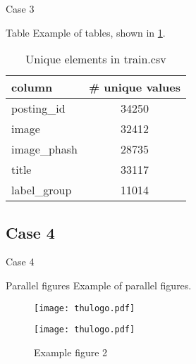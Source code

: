 \begin{frame}{Case 3}
  \begin{block}{Table}
    Example of tables, shown in \ref{tab:unique_values}. 

    \begin{table}[htbp]
      \small
      \centering
      \caption{Unique elements in train.csv }
      \label{tab:unique_values}
      \begin{tabular}{lc}
        \toprule
        column & \# unique values \\
        \midrule
        posting\_id & 34250 \\
        image & 32412 \\
        image\_phash & 28735 \\
        title & 33117 \\
        label\_group & 11014 \\
        \bottomrule
      \end{tabular}
    \end{table}
  \end{block}
\end{frame}

\subsection{Case 4}

\begin{frame}{Case 4}
  \begin{block}{Parallel figures}
    Example of parallel figures.
  \end{block}
  \begin{figure}[htbp]
    \centering
    \begin{minipage}[t]{0.48\textwidth}
      \centering
      \texttt{[image: thulogo.pdf]}
      \caption{Example figure 1}
      \label{fig:left_side}
    \end{minipage}
    \begin{minipage}[t]{0.48\textwidth}
      \centering
      \texttt{[image: thulogo.pdf]}
      \caption{Example figure 2}
      \label{fig:right_side}
    \end{minipage}
  \end{figure}
\end{frame}

